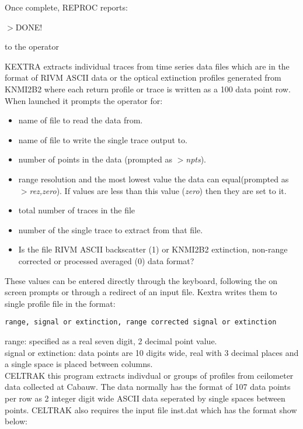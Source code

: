 \noindent
Once complete, REPROC reports:

\noindent
\begin{center}
	$>$DONE!
\end{center}
\noindent
to the operator

KEXTRA extracts individual traces from time series data files 
which are in the format of RIVM ASCII data or the optical extinction 
profiles generated from KNMI2B2 where each return profile 
or trace is written as a 100 data point row.
When launched it prompts the operator for:


\noindent
\begin{itemize}
\item name of file to read the data from.
\item name of file to write the single trace output to.
\item number of points in the data (prompted as {\em $>$npts}).
\item range resolution and the most lowest value the data
can equal(prompted as {\em $>$rez,zero}). 
If values are less than this value ({\em zero})
then they are set to it.
\item total number of traces in the file
\item number of the single trace to extract from that file.
\item Is the file RIVM ASCII backscatter (1) or KNMI2B2 extinction,
non-range corrected or processed averaged (0) data format?
\end{itemize}

\noindent
These values can be entered directly through the keyboard,
following the on screen prompts or through a redirect of an
input file. Kextra writes them  to single profile file in the format:

\begin{center}
	{\tt range, signal or extinction, range corrected signal or extinction}
\end{center}

\noindent
range: specified as a real seven digit, 2 decimal point 
value.\\
signal or extinction: data points are 10 digits wide, 
real with 3 decimal places and a single space is placed between columns.\\

CELTRAK this program extracts indivdual or groups of profiles from
ceilometer data collected at Cabauw. The data normally has the format of
107 data points per row as 2 integer digit wide ASCII data seperated 
by single spaces between points. CELTRAK also requires the input file 
inst.dat which has the format show below:


